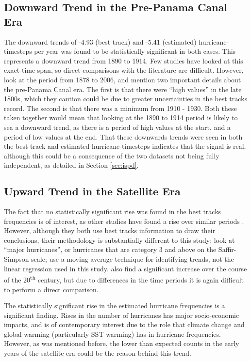 \documentclass[pdftex,12pt,a4paper]{report}
\newcommand{\ts}{\textsuperscript}
\begin{document}
\subsection{Downward Trend in the Pre-Panama Canal Era}
The downward trends of -4.93 (best track) and -5.41 (estimated) hurricane-timesteps per year was
found to be statistically significant in both cases. This represents a downward trend from 1890 to
1914. Few studies have looked at this exact time span, so direct comparisons with the literature are
difficult. However, \textcite{vecchi2008estimates} look at the period from 1878 to 2006, and mention
two important details about the pre-Panama Canal era. The first is that there were ``high values''
in the late 1800s, which they caution could be due to greater uncertainties in the best tracks
record. The second is that there was a minimum from 1910 - 1930. Both these taken together would
mean that looking at the 1890 to 1914 period is likely to sea a downward trend, as there is a period
of high values at the start, and a period of low values at the end. That these downwards trends were
seen in both the best track and estimated hurricane-timesteps indicates that the signal is real,
although this could be a consequence of the two datasets not being fully independent, as detailed in
Section \ref{sec:ispd}.

\subsection{Upward Trend in the Satellite Era}

The fact that no statistically significant rise was found in the best tracks frequencies is of
interest, as other studies have found a rise over similar periods \parencite{goldenberg2001recent,
holland2007heightened}. However, although they both use best tracks information to draw their
conclusions, their methodology is substantially different to this study:
\textcite{goldenberg2001recent} look at ``major hurricanes'', or hurricanes that are category 3 and
above on the Saffir-Simpson scale; \textcite{holland2007heightened} use a moving average technique
for identifying trends, not the linear regression used in this study.
\textcite{vecchi2008estimates} also find a significant increase over the course of the 20\ts{th}
century, but due to differences in the time periods it is again difficult to perform a direct
comparison.

The statistically significant rise in the estimated hurricane frequencies is a significant finding.
Rises in the number of hurricanes has major socio-economic impacts, and is of contemporary interest
due to the role that climate change and global warming (particularly SST warming) has in hurricane
frequencies. However, as was mentioned before, the lower than expected counts in the early years of
the satellite era could be the reason behind this trend.
\end{document}
